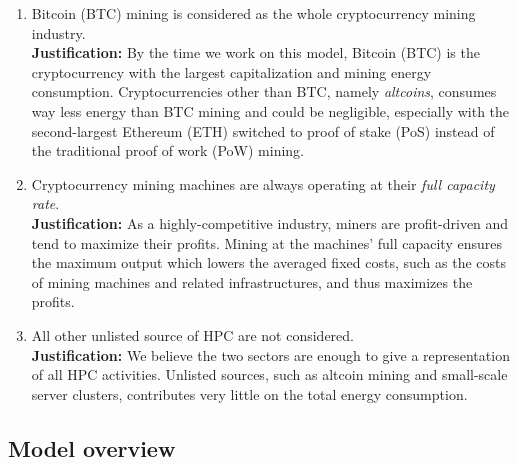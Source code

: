 \documentclass[12pt]{article}
\begin{document}
\begin{enumerate}
	\item Bitcoin (BTC) mining is considered as the whole cryptocurrency mining industry. \\
	\textbf{Justification:} By the time we work on this model, Bitcoin (BTC) is the cryptocurrency with the largest capitalization and mining energy consumption. Cryptocurrencies other than BTC, namely \textit{altcoins}, consumes way less energy than BTC mining and could be negligible, especially with the second-largest Ethereum (ETH) switched to proof of stake (PoS) instead of the traditional proof of work (PoW) mining. \citep{digiconomist}

	\item Cryptocurrency mining machines are always operating at their \textit{full capacity rate}. \\
	\textbf{Justification:} As a highly-competitive industry, miners are profit-driven and tend to maximize their profits. Mining at the machines' full capacity ensures the maximum output which lowers the averaged fixed costs, such as the costs of mining machines and related infrastructures, and thus maximizes the profits.

	\item All other unlisted source of HPC are not considered. \\
	\textbf{Justification:} We believe the two sectors are enough to give a representation of all HPC activities. Unlisted sources, such as altcoin mining and small-scale server clusters, contributes very little on the total energy consumption.
\end{enumerate}

\subsection{Model overview}
\end{document}
